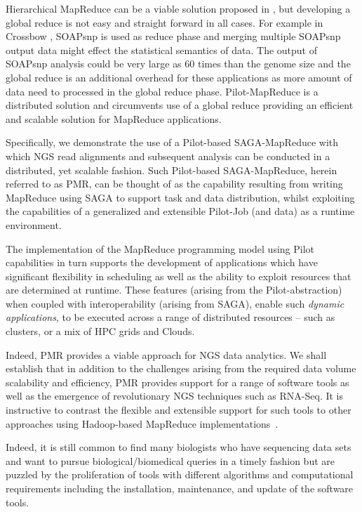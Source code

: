 \documentclass{acm_proc_article-sp}
\begin{document}
Hierarchical MapReduce can be a viable solution proposed in
\cite{ecmls11-mr-autodock}, but developing a global reduce is not easy
and straight forward in all cases. For example in Crossbow
\cite{langmead2010}, SOAPsnp is used as reduce phase and merging
multiple SOAPsnp output data might effect the statistical semantics of
data. The output of SOAPsnp analysis could be very large as 60 times
than the genome size\cite{soap_snp} and the global reduce is an
additional overhead for these applications as more amount of data need
to processed in the global reduce phase. Pilot-MapReduce
\cite{pmr2012} is a distributed solution and circumvents use of a
global reduce providing an efficient and scalable solution for
MapReduce applications.


Specifically, we demonstrate the use of a Pilot-based SAGA-MapReduce
with which NGS read alignments and subsequent analysis can be
conducted in a distributed, yet scalable fashion. Such Pilot-based
SAGA-MapReduce, herein referred to as PMR, can be thought of as the
capability resulting from writing MapReduce using SAGA to support task
and data distribution, whilst exploiting the capabilities of a
generalized and extensible Pilot-Job (and data) as a runtime
environment\cite{Sehgal2011590,pmr2012,pstar11}.

The implementation of the MapReduce programming model using Pilot
capabilities in turn supports the development of applications which
have significant flexibility in scheduling as well as the ability to
exploit resources that are determined at runtime.  These features
(arising from the Pilot-abstraction) when coupled with
interoperability (arising from SAGA), enable such {\it dynamic
  applications}, to be executed across a range of distributed
resources -- such as clusters, or a mix of HPC grids and Clouds.

Indeed, PMR provides a viable approach for NGS data analytics.  We
shall establish that in addition to the challenges arising from the
required data volume scalability and efficiency, PMR provides support
for a range of software tools as well as the emergence of
revolutionary NGS techniques such as RNA-Seq.  It is instructive to
contrast the flexible and extensible support for such tools to other
approaches using Hadoop-based MapReduce
implementations~\cite{cloudburst,langmead2009,seal2011,langmead2010}.

Indeed, it is still common to find many biologists who have sequencing
data sets and want to pursue biological/biomedical queries in a
timely fashion but are puzzled by the proliferation of tools with
different algorithms and computational requirements including the
installation, maintenance, and update of the software tools.
\end{document}
